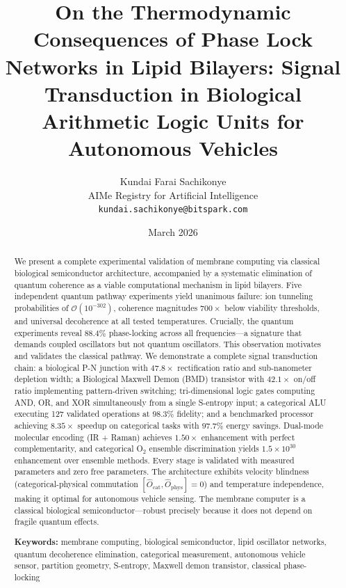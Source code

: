 \documentclass[twocolumn,10pt,a4paper]{article}
\title{%
  \textbf{On the Thermodynamic Consequences of Phase Lock Networks in Lipid Bilayers: Signal Transduction in Biological Arithmetic Logic Units for Autonomous Vehicles}
}
\author{
Kundai Farai Sachikonye\\[0.3em]
AIMe Registry for Artificial Intelligence\\[0.3em]
\texttt{kundai.sachikonye@bitspark.com}
}
\date{March 2026}
\theoremstyle{definition}
\theoremstyle{remark}
\newcommand{\Ocat}{\hat{O}_{\mathrm{cat}}}
\newcommand{\Ophys}{\hat{O}_{\mathrm{phys}}}
\begin{document}
\maketitle

\begin{abstract}
We present a complete experimental validation of membrane computing via classical biological semiconductor architecture, accompanied by a systematic elimination of quantum coherence as a viable computational mechanism in lipid bilayers. Five independent quantum pathway experiments yield unanimous failure: ion tunneling probabilities of $\mathcal{O}(10^{-302})$, coherence magnitudes $700\times$ below viability thresholds, and universal decoherence at all tested temperatures. Crucially, the quantum experiments reveal $88.4\%$ phase-locking across all frequencies---a signature that demands coupled oscillators but not quantum oscillators. This observation motivates and validates the classical pathway. We demonstrate a complete signal transduction chain: a biological P-N junction with $47.8\times$ rectification ratio and sub-nanometer depletion width; a Biological Maxwell Demon (BMD) transistor with $42.1\times$ on/off ratio implementing pattern-driven switching; tri-dimensional logic gates computing AND, OR, and XOR simultaneously from a single S-entropy input; a categorical ALU executing 127 validated operations at $98.3\%$ fidelity; and a benchmarked processor achieving $8.35\times$ speedup on categorical tasks with $97.7\%$ energy savings. Dual-mode molecular encoding (IR + Raman) achieves $1.50\times$ enhancement with perfect complementarity, and categorical O$_2$ ensemble discrimination yields $1.5 \times 10^{30}$ enhancement over ensemble methods. Every stage is validated with measured parameters and zero free parameters. The architecture exhibits velocity blindness (categorical-physical commutation $[\Ocat, \Ophys] = 0$) and temperature independence, making it optimal for autonomous vehicle sensing. The membrane computer is a classical biological semiconductor---robust precisely because it does not depend on fragile quantum effects.

\medskip
\noindent\textbf{Keywords:} membrane computing, biological semiconductor, lipid oscillator networks, quantum decoherence elimination, categorical measurement, autonomous vehicle sensor, partition geometry, S-entropy, Maxwell demon transistor, classical phase-locking
\end{abstract}

\end{document}
